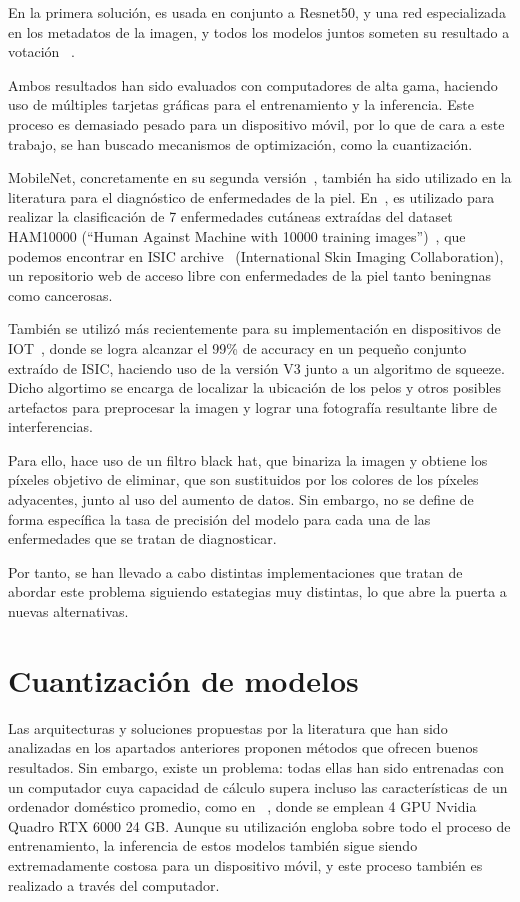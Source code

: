  En la primera solución, es usada en conjunto a Resnet50, y una red especializada en los metadatos de la imagen, y todos los modelos juntos someten su resultado a votación ~\cite{1stISIC}.

Ambos resultados han sido evaluados con computadores de alta gama, haciendo uso de múltiples tarjetas gráficas para el entrenamiento y la inferencia. Este proceso es demasiado pesado para un dispositivo móvil, por lo que de cara a este trabajo, se han buscado mecanismos de optimización, como la cuantización.

MobileNet, concretamente en su segunda versión~\cite{sandler2019mobilenetv2}, también ha sido utilizado en la literatura para el diagnóstico de enfermedades de la piel. En~\cite{Chaturvedi_2020}, es utilizado para realizar la clasificación de 7 enfermedades cutáneas extraídas del dataset HAM10000 (``Human Against Machine with 10000 training images'')~\cite{ham10000}, que podemos encontrar en ISIC archive~\cite{isicarchive} (International Skin Imaging Collaboration), un repositorio web de acceso libre con enfermedades de la piel tanto beningnas como cancerosas. 

También se utilizó más recientemente para su implementación en dispositivos de IOT~\cite{mnetsqueeze}, donde se logra alcanzar el 99\% de accuracy en un pequeño conjunto extraído de ISIC, haciendo uso de la versión V3 junto a un algoritmo de squeeze. Dicho algortimo se encarga de localizar la ubicación de los pelos y otros posibles artefactos para preprocesar la imagen y lograr una fotografía resultante libre de interferencias. 

Para ello, hace uso de un filtro black hat, que binariza la imagen y obtiene los píxeles objetivo de eliminar, que son sustituidos por los colores de los píxeles adyacentes, junto al uso del aumento de datos. Sin embargo, no se define de forma específica la tasa de precisión del modelo para cada una de las enfermedades que se tratan de diagnosticar.

Por tanto, se han llevado a cabo distintas implementaciones que tratan de abordar este problema siguiendo estategias muy distintas, lo que abre la puerta a nuevas alternativas.

 \section{Cuantización de modelos}
\label{cap:cuantización}
Las arquitecturas y soluciones propuestas por la literatura que han sido analizadas en los apartados anteriores proponen métodos que ofrecen buenos resultados. Sin embargo, existe un problema: todas ellas han sido entrenadas con un computador cuya capacidad de cálculo supera incluso las características de un ordenador doméstico promedio, como en ~\cite{2ndISIC}, donde se emplean 4  GPU Nvidia Quadro RTX 6000 24 GB. Aunque su utilización engloba sobre todo el proceso de entrenamiento, la inferencia de estos modelos también sigue siendo extremadamente costosa para un dispositivo móvil, y este proceso también es realizado a través del computador.

